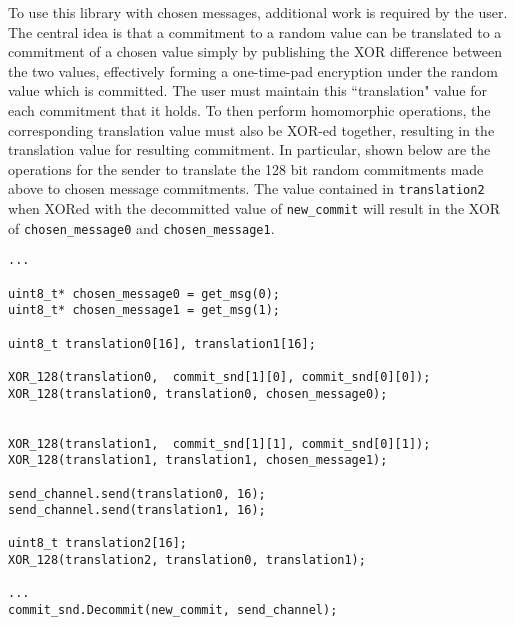 To use this library with chosen messages, additional work is required by the user. The central idea is that a commitment to a random value can be translated to a commitment of a chosen value simply by publishing the XOR difference between the two values, effectively forming a one-time-pad encryption under the random value which is committed. The user must maintain this ``translation" value for each commitment that it holds. To then perform homomorphic operations, the corresponding translation value must also be XOR-ed together, resulting in the translation value for resulting commitment. In particular, shown below are the operations for the sender to translate the 128 bit random commitments made above to chosen message commitments. The value contained in \texttt{translation2} when XORed with the decommitted value of \texttt{new\_commit} will result in the XOR of \texttt{chosen\_message0} and \texttt{chosen\_message1}.
\begin{lstlisting}     
...

uint8_t* chosen_message0 = get_msg(0);
uint8_t* chosen_message1 = get_msg(1);

uint8_t translation0[16], translation1[16];

XOR_128(translation0,  commit_snd[1][0], commit_snd[0][0]);
XOR_128(translation0, translation0, chosen_message0);


XOR_128(translation1,  commit_snd[1][1], commit_snd[0][1]);
XOR_128(translation1, translation1, chosen_message1);

send_channel.send(translation0, 16);
send_channel.send(translation1, 16);

uint8_t translation2[16];
XOR_128(translation2, translation0, translation1);

...
commit_snd.Decommit(new_commit, send_channel);
\end{lstlisting}

